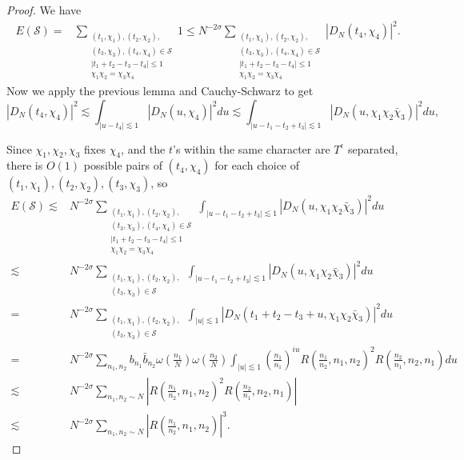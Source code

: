 \begin{proof}
    We have \begin{align*}    
    E(\mathcal{S})=& \sum_{\substack{(t_1,\chi_1),(t_2,\chi_2),\\ (t_3,\chi_3),(t_4,\chi_4)\in \mathcal{S}\\|t_1+t_2-t_3-t_4|\leq 1\\ \chi_1\chi_2=\chi_3\chi_4}} 1 
    \leq N^{-2\sigma}\sum_{\substack{(t_1,\chi_1),(t_2,\chi_2),\\ (t_3,\chi_3),(t_4,\chi_4)\in \mathcal{S}\\ |t_1+t_2-t_3-t_4|\leq 1\\ \chi_1\chi_2=\chi_3\chi_4}} |D_N(t_4,\chi_4)|^2.
    \end{align*}
    Now we apply the previous lemma and Cauchy-Schwarz to get \[
        |D_N(t_4,\chi_4)|^2\lesssim \int_{|u-t_4|\lesssim 1} |D_N(u,\chi_4)|^2du \lesssim  \int_{|u-t_1-t_2+t_3|\lesssim 1} |D_N(u,\chi_1\chi_2\bar{\chi}_3)|^2du,
    \]
   
    Since $\chi_1,\chi_2,\chi_3$ fixes $\chi_4$, and the $t$'s within the same character are $T^\epsilon$ separated, there is $O(1)$ possible pairs of $(t_4,\chi_4)$ for each choice of $(t_1,\chi_1),(t_2,\chi_2),(t_3,\chi_3)$, so \begin{align*}    
        E(\mathcal{S})\lesssim& N^{-2\sigma}\sum_{\substack{(t_1,\chi_1),(t_2,\chi_2),\\ (t_3,\chi_3),(t_4,\chi_4)\in \mathcal{S}\\ |t_1+t_2-t_3-t_4|\leq 1\\ \chi_1\chi_2=\chi_3\chi_4}} \int_{|u-t_1-t_2+t_3|\lesssim 1} |D_N(u,\chi_1\chi_2\bar{\chi}_3)|^2du\\
        \lesssim&  N^{-2\sigma}\sum_{\substack{(t_1,\chi_1),(t_2,\chi_2),\\ (t_3,\chi_3)\in \mathcal{S}}} \int_{|u-t_1-t_2+t_3|\lesssim 1} |D_N(u,\chi_1\chi_2\bar{\chi}_3)|^2du\\
        =& N^{-2\sigma}\sum_{\substack{(t_1,\chi_1),(t_2,\chi_2),\\ (t_3,\chi_3)\in \mathcal{S}}} \int_{|u|\lesssim 1} |D_N(t_1+t_2-t_3 + u,\chi_1\chi_2\bar{\chi}_3)|^2du\\
        =&N^{-2\sigma}\sum_{n_1,n_2} b_{n_1}\bar{b}_{n_2} \omega\left(\frac{n_1}{N}\right)\omega\left(\frac{n_2}{N}\right)\int_{|u|\lesssim 1} \left(\frac{n_1}{n_1}\right)^{iu}R\left(\frac{n_1}{n_2},n_1,n_2\right)^2 R\left(\frac{n_2}{n_1},n_2,n_1\right)du\\
        \lesssim & N^{-2\sigma}\sum_{n_1,n_2\sim N}\left|R\left(\frac{n_1}{n_2},n_1,n_2\right)^2 R\left(\frac{n_2}{n_1},n_2,n_1\right)\right|\\
        \lesssim & N^{-2\sigma}\sum_{n_1,n_2\sim N}\left|R\left(\frac{n_1}{n_2},n_1,n_2\right) \right|^3.
        \end{align*}
\end{proof}

